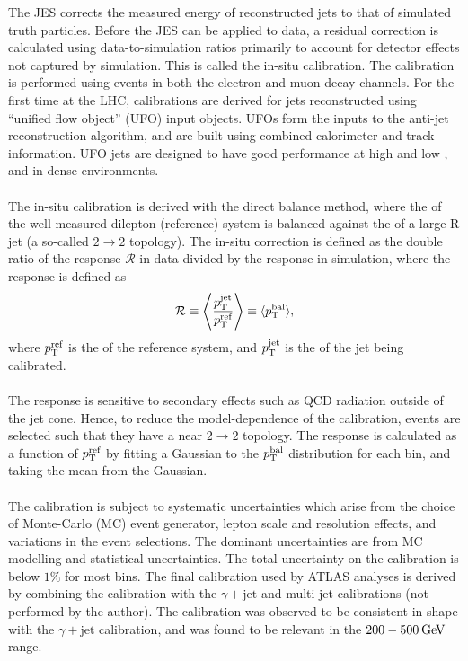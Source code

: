 \documentclass{thesissummary}
\begin{document}
The JES corrects the measured energy of reconstructed jets to that of simulated truth particles. Before the JES can be applied to data, a residual correction is calculated using data-to-simulation ratios primarily to account for detector effects not captured by simulation. This is called the in-situ calibration. The calibration is performed using \zjet events in both the electron and muon decay channels. For the first time at the LHC, calibrations are derived for jets reconstructed using ``unified flow object'' (UFO) input objects. UFOs form the inputs to the anti-\kt jet reconstruction algorithm, and are built using combined calorimeter and track information. UFO jets are designed to have good performance at high and low \pt, and in dense environments.%
\\\\
The in-situ calibration is derived with the direct balance method, where the \pt of the well-measured dilepton (reference) system is balanced against the \pt of a large-R jet (a so-called $2\rightarrow2$ topology). The in-situ correction is defined as the double ratio of the response $\mathcal{R}$ in data divided by the response in simulation, where the response is defined as 
\begin{equation}
    \mathcal{R} \equiv \Bigg\langle\frac{p_{\text{T}}^{\text{jet}}}{p_{\text{T}}^{\text{ref}}}\Bigg\rangle \equiv \langle p_{\text{T}}^{\text{bal}}\rangle,
\end{equation}
where $p_{\text{T}}^{\text{ref}}$ is the \pt of the reference system, and $p_{\text{T}}^{\text{jet}}$ is the \pt of the jet being calibrated.
\\\\
The response is sensitive to secondary effects such as QCD radiation outside of the jet cone. Hence, to reduce the model-dependence of the calibration, events are selected such that they have a near $2\rightarrow2$ topology. The response is calculated as a function of $p_{\text{T}}^{\text{ref}}$ by fitting a Gaussian to the $p_{\text{T}}^{\text{bal}}$ distribution for each bin, and taking the mean from the Gaussian.%
\\\\
The calibration is subject to systematic uncertainties which arise from the choice of Monte-Carlo (MC) event generator, lepton scale and resolution effects, and variations in the event selections. The dominant uncertainties are from MC modelling and statistical uncertainties. The total uncertainty on the calibration is below $1\%$ for most bins. The final calibration used by ATLAS analyses is derived by combining the \zjet calibration with the $\gamma+\text{jet}$ and multi-jet calibrations (not performed by the author). The \zjet calibration was observed to be consistent in shape with the $\gamma+\text{jet}$ calibration, and was found to be relevant in the $200-500\hspace{2pt}\text{Ge\kern -0.1em V}$ range.
\end{document}
